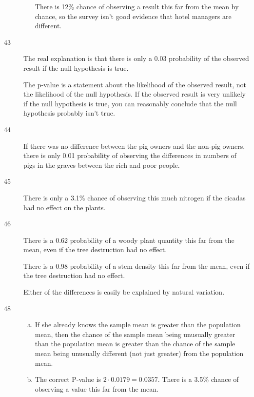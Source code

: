 \documentclass[letterpaper, landscape]{exam}
\begin{document}
\begin{description}
\begin{enumerate}[(a)]
            There is 12\% chance of observing a result this far from the mean by
            chance, so the survey isn't good evidence that hotel managers are
            different.

        \end{enumerate}

      \item[43] The real explanation is that there is only a 0.03 probability of
        the observed result if the null hypothesis is true. 
        
        The p-value is a statement about the likelihood of the observed result,
        not the likelihood of the null hypothesis. If the observed result is
        very unlikely if the null hypothesis is true, you can reasonably
        conclude that the null hypothesis probably isn't true.

      \item[44] If there was no difference between the pig owners and the
        non-pig owners, there is only 0.01 probability of observing the
        differences in numbers of pigs in the graves between the rich and poor
        people.

      \item[45] There is only a 3.1\% chance of observing this much nitrogen if
        the cicadas had no effect on the plants.

      \item[46] There is a 0.62 probability of a woody plant quantity this far
        from the mean, even if the tree destruction had no effect.

        There is a 0.98 probability of a stem density this far from the mean, even
        if the tree destruction had no effect.

        Either of the differences is easily be explained by natural variation.

      \item[48] 
        \begin{enumerate}[(a)]
          \item If she already knows the sample mean is greater than the
            population mean, then the chance of the sample mean being unusually
            greater than the population mean is greater than the chance of the
            sample mean being unusually different (not just greater) from the
            population mean.

          \item The correct P-value is $2 \cdot 0.0179 = 0.0357$. There is a
            3.5\% chance of observing a value this far from the mean.


\end{enumerate}
\end{description}
\end{document}

